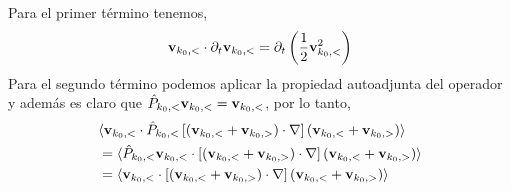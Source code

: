 \documentclass[executivepaper,12pt]{article}
\numberwithin{equation}{section}
\begin{document}
 Para el primer término tenemos,
 \begin{equation*}
 	\vb{v}_{k_0,<} \cdot \partial_t \vb{v}_{k_0,<}=\partial_t\left(\frac{1}{2}\vb{v}_{k_0,<}^2\right)
 \end{equation*}
 Para el segundo término podemos aplicar la propiedad autoadjunta del operador y además es claro que $\hat{P}_{k_0,<}\vb{v}_{k_0,<}=\vb{v}_{k_0,<}$, por lo tanto,
 \begin{align*}
 	&\langle \vb{v}_{k_0,<} \cdot \hat{P}_{k_0,<}\left[(\vb{v}_{k_0,<}+\vb{v}_{k_0,>})\cdot\vb{\nabla}\right](\vb{v}_{k_0,<}+\vb{v}_{k_0,>})\rangle\\
 	&=\langle \hat{P}_{k_0,<}\vb{v}_{k_0,<} \cdot \left[(\vb{v}_{k_0,<}+\vb{v}_{k_0,>})\cdot\vb{\nabla}\right](\vb{v}_{k_0,<}+\vb{v}_{k_0,>})\rangle\\
 	&=\langle \vb{v}_{k_0,<} \cdot \left[(\vb{v}_{k_0,<}+\vb{v}_{k_0,>})\cdot\vb{\nabla}\right](\vb{v}_{k_0,<}+\vb{v}_{k_0,>})\rangle
 \end{align*}
 
\end{document}
